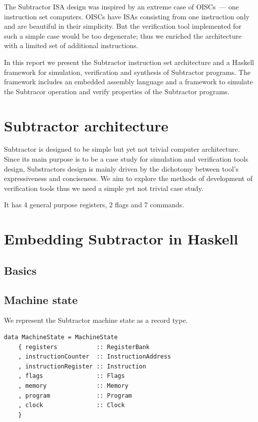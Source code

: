 The Subtractor ISA design was inspired by an extreme case of OISCs~--- one instruction set computers. OISCs have ISAs consisting from one instruction only and are beautiful in their simplicity. But the verification tool implemented for such a simple case would be too degenerate; thus we enriched the architecture with a limited set of additional instructions.

In this report we present the Subtractor instruction set architecture and a Haskell framework for simulation, verification and synthesis of Subtractor programs. The framework includes an embedded assembly language and a framework to simulate the Subtracor operation and verify properties of the Subtractor programs.

\section{Subtractor architecture}

Subtractor is designed to be simple but yet not trivial computer architecture. Since its main purpose is to be a case study for simulation and verification tools design, Substractors design is mainly driven by the dichotomy between tool's expressiveness and conciseness. We aim to explore the methods of development of verification tools thus we need a simple yet not trivial case study.

It has 4 general purpose registers, 2 flags and 7 commands.

\section{Embedding Subtractor in Haskell}

\subsection{Basics}

\subsection{Machine state}

We represent the Subtractor machine state as a record type.

\begin{verbatim}
data MachineState = MachineState
    { registers           :: RegisterBank
    , instructionCounter  :: InstructionAddress
    , instructionRegister :: Instruction
    , flags               :: Flags
    , memory              :: Memory
    , program             :: Program
    , clock               :: Clock
    }
\end{verbatim}

